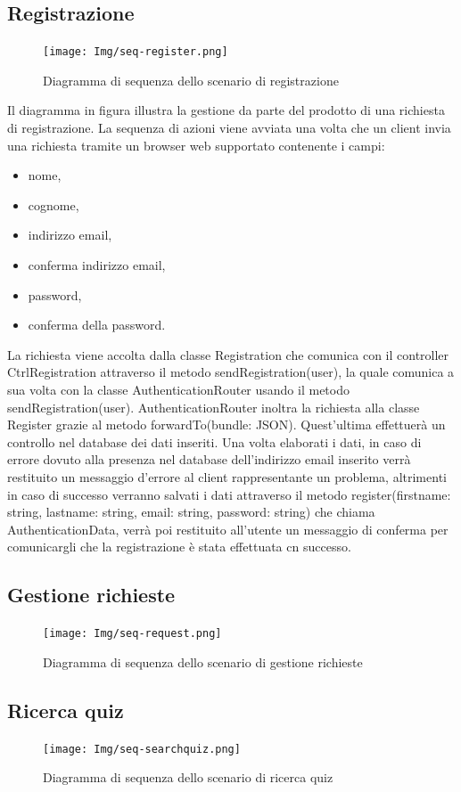 \documentclass[a4paper, titlepage]{article}
\begin{document}
	\subsection{Registrazione}
	\begin{figure}[!h]
		\centering
		\texttt{[image: Img/seq-register.png]}
		\caption{Diagramma di sequenza dello scenario di registrazione}
	\end{figure}
	Il diagramma in figura illustra la gestione da parte del prodotto di una richiesta di registrazione. La sequenza di azioni viene avviata una volta che un client invia una richiesta tramite un browser web supportato contenente i campi: 
	\begin{itemize}
		\item nome,
		\item cognome,
		\item indirizzo email,
		\item conferma indirizzo email,
		\item password,
		\item conferma della password.
	\end{itemize}
	La richiesta viene accolta dalla classe Registration che comunica con il controller CtrlRegistration attraverso il metodo sendRegistration(user), la quale comunica a sua volta con la classe AuthenticationRouter usando il metodo sendRegistration(user).
	AuthenticationRouter inoltra la richiesta alla classe Register grazie al metodo forwardTo(bundle: JSON). Quest'ultima effettuerà un controllo nel database dei dati inseriti. Una volta elaborati i dati, in caso di errore dovuto alla presenza nel database dell'indirizzo email inserito verrà restituito un messaggio d'errore al client rappresentante un problema, altrimenti in caso di successo verranno salvati i dati attraverso il metodo register(firstname: string, lastname: string, email: string, password: string) che chiama AuthenticationData, verrà poi restituito all'utente un messaggio di conferma per comunicargli che la registrazione è stata effettuata cn successo.
	
	
	\subsection{Gestione richieste}
	\begin{figure}[!h]
		\centering
		\texttt{[image: Img/seq-request.png]}
		\caption{Diagramma di sequenza dello scenario di gestione richieste}
	\end{figure}
	
	\subsection{Ricerca quiz}
	\begin{figure}[!h]
		\centering
		\texttt{[image: Img/seq-searchquiz.png]}
		\caption{Diagramma di sequenza dello scenario di ricerca quiz}
	\end{figure}
	
\end{document}
